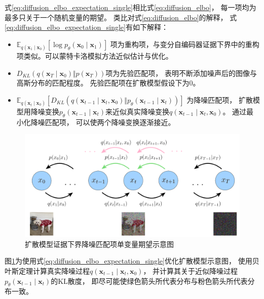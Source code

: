 式{\ref{eq:diffusion_elbo_expectation_single}}相比式{\ref{eq:diffusion_elbo}}，
每一项均为最多只关于一个随机变量的期望。
类比对式{\ref{eq:diffusion_elbo}}的解释，
式{\ref{eq:diffusion_elbo_expectation_single}}有如下解释：
\begin{itemize}
    \item {$\mathbb{E}_{q(\bm{x}_{1}\mid \bm{x}_0)} \left[  \log p_{\theta}(\bm{x}_{0}\mid \bm{x}_{1}) \right]$}
项为重构项，与变分自编码器证据下界中的重构项类似。可以蒙特卡洛模拟方法近似估计与优化。
\item {$D_{KL}(q(\bm{x}_{T}\mid \bm{x}_{0}) \Vert p(\bm{x}_{T}))$}项为先验匹配项，
表明不断添加噪声后的图像与高斯分布的匹配程度。
先验匹配项在扩散模型假设下为{$0$}。
\item {$ \mathbb{E}_{q(\bm{x}_{t}\mid \bm{x}_0)} \left[ D_{KL}(q(\bm{x}_{t-1}\mid \bm{x}_{t},\bm{x}_0)\Vert p_{\theta}(\bm{x}_{t-1}\mid \bm{x}_{t}))  \right] $ }
为降噪匹配项，
扩散模型用降噪变换{$p_{\theta}(\bm{x}_{t-1}\mid \bm{x}_{t})$}来近似真实降噪变换{$q(\bm{x}_{t-1}\mid \bm{x}_{t},\bm{x}_0)$}。
通过最小化降噪匹配项，
可以使两个降噪变换逐渐接近。
\end{itemize}
\begin{figure}[ht]
    \centering
    \includegraphics[width=\textwidth]{figures/diffusion_model_optimize_elbo_single_variable}
    \caption{扩散模型证据下界降噪匹配项单变量期望示意图}\label{fig:diffusion_model_optimize_elbo_single_variable}
\end{figure}

图{\ref{fig:diffusion_model_optimize_elbo_single_variable}}为使用式{\ref{eq:diffusion_elbo_expectation_single}}优化扩散模型示意图，
使用贝叶斯定理计算真实降噪过程{$q(\bm{x}_{t-1}\mid \bm{x}_{t},\bm{x}_0)$}，
并计算其关于近似降噪过程{$p_{\theta}(\bm{x}_{t-1}\mid \bm{x}_{t})$}的KL散度，
即尽可能使绿色箭头所代表分布与粉色箭头所代表分布一致。

